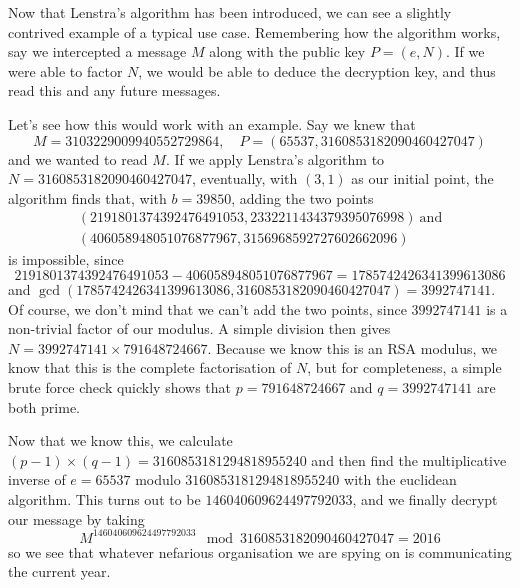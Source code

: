 
Now that Lenstra's algorithm has been introduced, we can see a slightly contrived example of a typical use case. Remembering how the algorithm works, say we intercepted a message $M$ along with the public key $P = (e,N)$. If we were able to factor $N$, we would be able to deduce the decryption key, and thus read this and any future messages. 

Let's see how this would work with an example. Say we knew that
$$ M = 3103229009940552729864,\quad P = (65537, 3160853182090460427047) $$
and we wanted to read $M$. If we apply Lenstra's algorithm to $N = 3160853182090460427047$, eventually, with $(3,1)$ as our initial point, the algorithm finds that, with $b = 39850$, adding the two points
\begin{align*}
(2191801374392476491053, 2332211434379395076998)\ \text{and}\\
(406058948051076877967, 3156968592727602662096)
\end{align*}
is impossible, since 
$$2191801374392476491053-406058948051076877967 = 1785742426341399613086$$ and $\gcd(1785742426341399613086, 3160853182090460427047) = 3992747141$. Of course, we don't mind that we can't add the two points, since $3992747141$ is a non-trivial factor of our modulus. A simple division then gives $N = 3992747141 \times 791648724667$. Because we know this is an RSA modulus, we know that this is the complete factorisation of $N$, but for completeness, a simple brute force check quickly shows that $p = 791648724667$ and $q = 3992747141$ are both prime.

Now that we know this, we calculate $(p-1) \times (q-1) = 3160853181294818955240$ and then find the multiplicative inverse of $e = 65537$ modulo $3160853181294818955240$ with the euclidean algorithm. This turns out to be $146040609624497792033$, and we finally decrypt our message by taking
$$ M^{146040609624497792033} \mod 3160853182090460427047 =2016 $$
so we see that whatever nefarious organisation we are spying on is communicating the current year.
